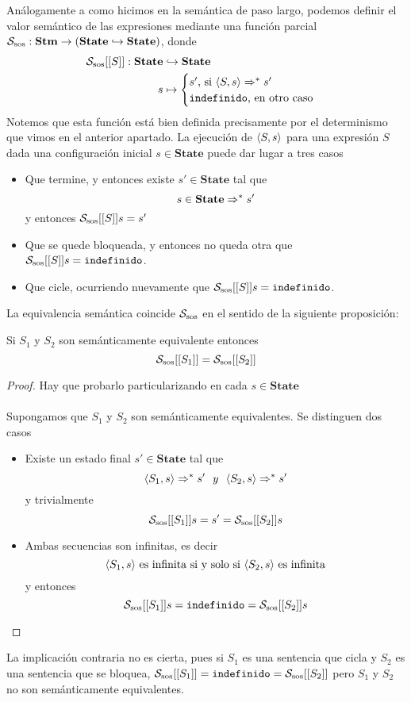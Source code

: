 Análogamente a como hicimos en la semántica de paso largo, podemos definir el valor semántico de las expresiones mediante una función parcial $\mathcal{S}_{\mathrm{sos}}: \mathbf{Stm}\rightarrow (\mathbf{State}\hookrightarrow\mathbf{State})$, donde
\begin{align*}
    \mathcal{S}_{\mathrm{sos}}[[S]]:  \mathbf{State} & \hookrightarrow  \mathbf{State} \\
                     s               & \mapsto          \begin{cases} s' \text{, si } \langle S, s \rangle\Rightarrow^* s' \\ 
                        \texttt{indefinido} \text{, en otro caso}
                        \end{cases}
\end{align*}
Notemos que esta función está bien definida precisamente por el determinismo que vimos en el anterior apartado. La ejecución de $\langle S, s \rangle$ para una expresión $S$ dada una configuración inicial $s\in\textbf{State}$ puede dar lugar a tres casos
\begin{itemize}
    \item Que termine, y entonces existe $s'\in\textbf{State}$ tal que
    \[
        s\in\textbf{State} \Rightarrow^* s'
    \]
    y entonces $\mathcal{S}_{\mathrm{sos}}[[S]]s = s'$
    \item Que se quede bloqueada, y entonces no queda otra que $\mathcal{S}_{\mathrm{sos}}[[S]]s = \texttt{indefinido}$.
    \item Que cicle, ocurriendo nuevamente que $\mathcal{S}_{\mathrm{sos}}[[S]]s = \texttt{indefinido}$.
\end{itemize} 
La equivalencia semántica coincide $\mathcal{S}_{\mathrm{sos}}$ en el sentido de la siguiente proposición: \\

\begin{prop} Si $S_1$ y $S_2$ son semánticamente equivalente entonces
\[
        \mathcal{S}_{\mathrm{sos}}[[S_1]] = \mathcal{S}_{\mathrm{sos}}[[S_2]]
\] 
\begin{proof} Hay que probarlo particularizando en cada $s\in\textbf{State}$ \\ \\
Supongamos que $S_1$ y $S_2$ son semánticamente equivalentes. Se distinguen dos casos
\begin{itemize}
    \item Existe un estado final $s'\in\textbf{State}$ tal que
    \[
        \la{S_1}{s}\dto^* s'\ \ y\ \ \la{S_2}{s} \dto^* s'
    \]
    y trivialmente
    \[
        \mathcal{S}_{\mathrm{sos}}[[S_1]]s = s' =  \mathcal{S}_{\mathrm{sos}}[[S_2]]s
    \]
    \item Ambas secuencias son infinitas, es decir
    \[
        \langle S_1, s \rangle\text{ es infinita si y solo si } \langle S_2, s \rangle \text{ es infinita}
    \]
    y entonces
    \[
        \mathcal{S}_{\mathrm{sos}}[[S_1]]s = \texttt{indefinido} =  \mathcal{S}_{\mathrm{sos}}[[S_2]]s
    \]
\end{itemize}
\end{proof}
\end{prop}
\noindent La implicación contraria no es cierta, pues si $S_1$ es una sentencia que cicla y $S_2$ es una sentencia que se bloquea, $ \mathcal{S}_{\mathrm{sos}}[[S_1]] = \texttt{indefinido} = \mathcal{S}_{\mathrm{sos}}[[S_2]]$ pero $S_1$ y $S_2$ no son semánticamente equivalentes.

